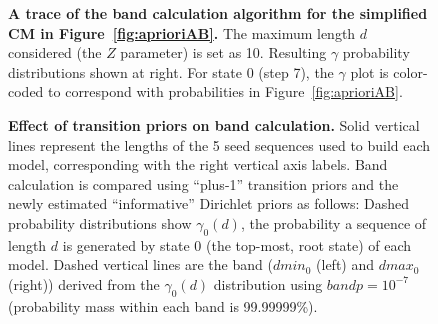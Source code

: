 \documentclass[11pt]{article}
\begin{document}
\begin{figure}
\begin{center}
\caption{\textbf{A trace of the band calculation
  algorithm for the simplified CM in Figure~\ref{fig:aprioriAB}.} 
    The maximum length $d$ considered (the $Z$ parameter) is set as
    10. Resulting $\gamma$ probability distributions shown at right. For
    state $0$ (step 7), the $\gamma$ plot is color-coded to correspond
    with probabilities in Figure~\ref{fig:aprioriAB}.}
\label{fig:aprioriC}
\end{center}
\end{figure}

\begin{figure}
  \begin{center}
    \label{fig:3bands}
    \caption{\textbf{Effect of transition priors on band calculation.}
  Solid vertical lines represent the lengths of the 5
  seed sequences used to build each model, corresponding with the
  right vertical axis labels. Band calculation is compared using
  ``plus-1'' transition priors and the newly estimated ``informative''
  Dirichlet priors as follows: Dashed
  probability distributions show $\gamma_0(d)$, the probability a
  sequence of length $d$ is generated by state $0$ (the top-most, root state)
  of each model. Dashed vertical lines are the band ($dmin_0$ (left) and
  $dmax_0$ (right)) derived from the $\gamma_0(d)$ distribution using $bandp =
  10^{-7}$ (probability mass within each band is 99.99999\%).}
  \end{center}
\end{figure}
\end{document}
